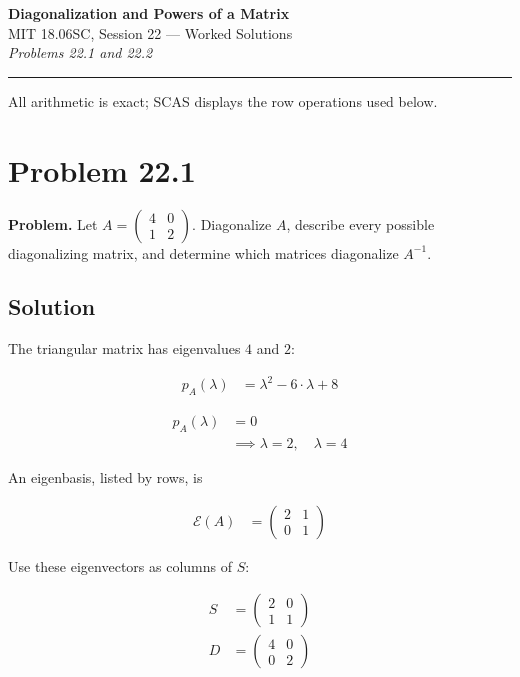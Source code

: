 \documentclass[11pt]{article}
\begin{document}
\begin{center}{\Large\bfseries Diagonalization and Powers of a Matrix}\\[0.4em]{\large MIT 18.06SC, Session 22 --- Worked Solutions}\\[0.6em]\textit{Problems 22.1 and 22.2}\end{center}
\vspace{0.25em}\hrule\vspace{1em}
All arithmetic is exact; SCAS displays the row operations used below.

\section*{Problem 22.1}
\textbf{Problem.} Let \(A=\begin{pmatrix}4&0\\1&2\end{pmatrix}\). Diagonalize \(A\), describe every possible diagonalizing matrix, and determine which matrices diagonalize \(A^{-1}\).

\subsection*{Solution}
The triangular matrix has eigenvalues \(4\) and \(2\):

\[\begin{aligned}p_{A}\left(\lambda\right) &= \lambda^{2} - 6 \cdot \lambda + 8\end{aligned}\]

\[\begin{aligned}p_{A}\left(\lambda\right) &= 0 \\ &\implies \lambda = 2,\quad \lambda = 4\end{aligned}\]

An eigenbasis, listed by rows, is

\[\begin{aligned}\mathcal{E}\left(A\right) &= \begin{pmatrix}2 & 1 \\ 0 & 1\end{pmatrix}\end{aligned}\]

Use these eigenvectors as columns of \(S\):

\begin{align*}S &= \begin{pmatrix}2 & 0 \\ 1 & 1\end{pmatrix} \\
D &= \begin{pmatrix}4 & 0 \\ 0 & 2\end{pmatrix}\end{align*}
\end{document}
